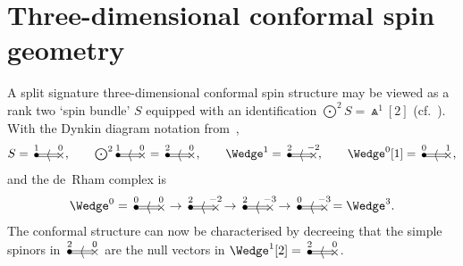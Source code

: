 \documentclass[pdftex]{sigma}%
\numberwithin{equation}{section}
\newcommand{\btwo}[2]{\begin{picture}(28,11)
\put(4,1.5){\makebox(0,0){$\bullet$}}
\put(24,1.5){\makebox(0,0){$\times$}}
\put(23,2.5){\line(-1,0){20}}
\put(23,0.5){\line(-1,0){20}}
\put(14,1.5){\makebox(0,0){$\langle$}}
\put(4,8){\makebox(0,0){$\scriptstyle #1$}}
\put(24,8){\makebox(0,0){$\scriptstyle #2$}}
\end{picture}}
\begin{document}
\section{Three-dimensional conformal spin geometry}\label{3d_conformal}
A split signature three-dimensional conformal spin structure may be viewed as a
rank two `spin bundle' $S$ equipped with an identification
$\bigodot^2\!S=\Wedge^1[2]$ (cf.~\cite{S}). With the Dynkin diagram notation
from~\cite{BE},
\[\textstyle S=\btwo{1}{0},\qquad \bigodot^2\!\btwo{1}{0}=\btwo{2}{0},\qquad
\Wedge^1=\btwo{2}{-2},\qquad\Wedge^0[1]=\btwo{0}{1},\]
and the de~Rham complex is
\[\Wedge^0=\btwo{0}{0}\to\btwo{2}{-2}\to\btwo{2}{-3}\to\btwo{0}{-3}
=\Wedge^3.\]
The conformal structure can now be characterised by decreeing that the simple
spinors in $\btwo{2}{0}$ are the null vectors in $\Wedge^1[2]=\btwo{2}{0}$.
\end{document}
